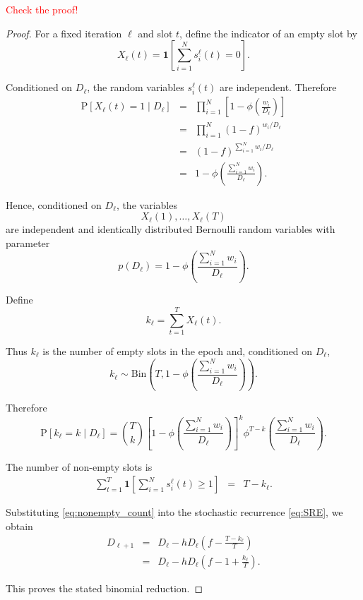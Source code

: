 \documentclass[10pt]{iopart}
\newcommand{\old}{\textcolor{red}}
\newcommand{\1}{\mathbf{1}}
\newcommand{\Prob}{\mathrm{P}}
\begin{document}
\old{Check the proof!}
\begin{proof}
For a fixed iteration $\ell$ and slot $t$, define the indicator of an empty slot by
\begin{equation}
X_\ell(t)
=
\1\left[
\sum_{i=1}^N s_i^\ell(t)=0
\right].
\label{eq:empty_indicator}
\end{equation}

Conditioned on $D_\ell$, the random variables $s_i^\ell(t)$ are independent. Therefore
\begin{eqnarray}
\Prob\left[X_\ell(t)=1\mid D_\ell\right]
&=&
\prod_{i=1}^N
\left[
1-\phi\left(\frac{w_i}{D_\ell}\right)
\right]
\nonumber\\
&=&
\prod_{i=1}^N
(1-f)^{w_i/D_\ell}
\nonumber\\
&=&
(1-f)^{\sum_{i=1}^N w_i/D_\ell}
\nonumber\\
&=&
1-\phi\left(
\frac{\sum_{i=1}^N w_i}{D_\ell}
\right).
\label{eq:empty_probability}
\end{eqnarray}

Hence, conditioned on $D_\ell$, the variables
\begin{equation}
X_\ell(1),\ldots,X_\ell(T)
\end{equation}
are independent and identically distributed Bernoulli random variables with parameter
\begin{equation}
p(D_\ell)
=
1-\phi\left(
\frac{\sum_{i=1}^N w_i}{D_\ell}
\right).
\label{eq:empty_prob_parameter}
\end{equation}

Define
\begin{equation}
k_\ell
=
\sum_{t=1}^T X_\ell(t).
\label{eq:k_empty_slots}
\end{equation}

Thus $k_\ell$ is the number of empty slots in the epoch and, conditioned on $D_\ell$,
\begin{equation}
k_\ell
\sim
\mathrm{Bin}\left(
T,
1-\phi\left(
\frac{\sum_{i=1}^N w_i}{D_\ell}
\right)
\right).
\label{eq:k_binomial}
\end{equation}

Therefore
\begin{equation}
\Prob[k_\ell=k\mid D_\ell]
=
{T\choose k}
\left[
1-\phi\left(
\frac{\sum_{i=1}^N w_i}{D_\ell}
\right)
\right]^k
\phi^{T-k}\left(
\frac{\sum_{i=1}^N w_i}{D_\ell}
\right).
\label{eq:k_distribution}
\end{equation}

The number of non-empty slots is
\begin{eqnarray}
\sum_{t=1}^T
\1\left[
\sum_{i=1}^N s_i^\ell(t)\ge1
\right]
&=&
T-k_\ell.
\label{eq:nonempty_count}
\end{eqnarray}

Substituting \ref{eq:nonempty_count} into the stochastic recurrence
\ref{eq:SRE}, we obtain
\begin{eqnarray}
D_{\ell+1}
&=&
D_\ell
-
hD_\ell
\left(
f-\frac{T-k_\ell}{T}
\right)
\nonumber\\
&=&
D_\ell
-
hD_\ell
\left(
f-1+\frac{k_\ell}{T}
\right).
\label{eq:binomial_recurrence}
\end{eqnarray}

This proves the stated binomial reduction.
\end{proof}
\end{document}
